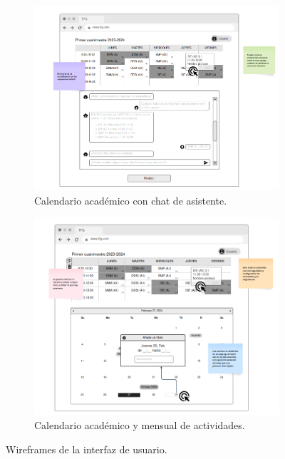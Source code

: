 \begin{figure}[H]
    \centering
    \begin{subfigure}[b]{0.51\textwidth}
        \centering
        \includegraphics[width=\textwidth]{./imagenes/Mockup_calendario.png}
        \caption{Calendario académico con chat de asistente.}
        \label{fig:wireframe_a}
    \end{subfigure}
    \hfill
    \begin{subfigure}[b]{0.48\textwidth}
        \centering
        \includegraphics[width=\textwidth]{./imagenes/Mockup_organizador.png}
        \caption{Calendario académico y mensual de actividades.}
        \label{fig:wireframe_b}
    \end{subfigure}
    \caption{Wireframes de la interfaz de usuario.}
\end{figure}



